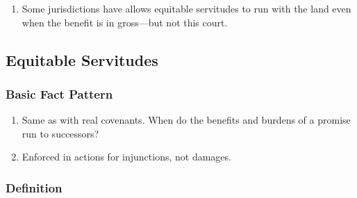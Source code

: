 \begin{enumerate}
\begin{enumerate}
        \begin{enumerate}
            \item The benefit was ``clearly personal'' (i.e., in gross) to the 
            defendant. It did not affect its land in any way.
            \item When the \emph{burden} is in gross and the \emph{benefit} 
            attaches to land, the covenant runs with the land.
            \item But when the \emph{benefit} is in gross and the 
            \emph{burden} attaches to land, the covenant \emph{does not} run 
            with the land.\footnote{Reader p. 257.}
        \end{enumerate}
    \end{enumerate}
    \item Some jurisdictions have allows equitable servitudes to run with the 
    land even when the benefit is in gross---but not this court.
\end{enumerate}

\subsection{Equitable Servitudes}

\subsubsection{Basic Fact Pattern}

\begin{enumerate}
    \item Same as with real covenants. When do the benefits and burdens of a 
    promise run to successors?
    \item Enforced in actions for injunctions, not damages.
\end{enumerate}

\subsubsection{Definition}

